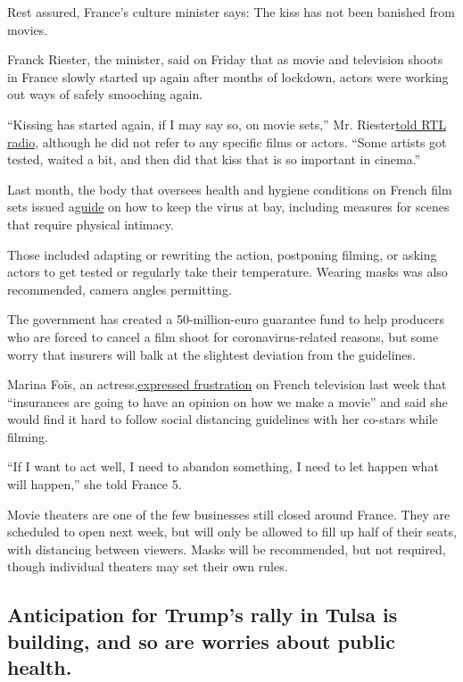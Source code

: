 Rest assured, France's culture minister says: The kiss has not been
banished from movies.

Franck Riester, the minister, said on Friday that as movie and
television shoots in France slowly started up again after months of
lockdown, actors were working out ways of safely smooching again.

``Kissing has started again, if I may say so, on movie sets,'' Mr.
Riester\href{https://www.youtube.com/watch?v=4dX3iuNs1u8}{told RTL
radio}, although he did not refer to any specific films or actors.
``Some artists got tested, waited a bit, and then did that kiss that is
so important in cinema.''

Last month, the body that oversees health and hygiene conditions on
French film sets issued
a\href{http://www.cchscinema.org/covid-19-guide-des-preconisations-de-securite-sanitaire-pour-les-activites-de-la-production-audiovisuelle-cinematographique-et-publicitaire/\#}{guide}
on how to keep the virus at bay, including measures for scenes that
require physical intimacy.

Those included adapting or rewriting the action, postponing filming, or
asking actors to get tested or regularly take their temperature. Wearing
masks was also recommended, camera angles permitting.

The government has created a 50-million-euro guarantee fund to help
producers who are forced to cancel a film shoot for coronavirus-related
reasons, but some worry that insurers will balk at the slightest
deviation from the guidelines.

Marina Foïs, an
actress,\href{https://www.voici.fr/news-people/actu-people/marina-fois-pourquoi-elle-trouve-ridicule-les-nouvelles-mesures-imposees-sur-les-tournages-682223}{expressed
frustration} on French television last week that ``insurances are going
to have an opinion on how we make a movie'' and said she would find it
hard to follow social distancing guidelines with her co-stars while
filming.

``If I want to act well, I need to abandon something, I need to let
happen what will happen,'' she told France 5.

Movie theaters are one of the few businesses still closed around France.
They are scheduled to open next week, but will only be allowed to fill
up half of their seats, with distancing between viewers. Masks will be
recommended, but not required, though individual theaters may set their
own rules.

\hypertarget{anticipation-for-trumps-rally-in-tulsa-is-building-and-so-are-worries-about-public-health}{%
\subsection{Anticipation for Trump's rally in Tulsa is building, and so
are worries about public
health.}\label{anticipation-for-trumps-rally-in-tulsa-is-building-and-so-are-worries-about-public-health}}


